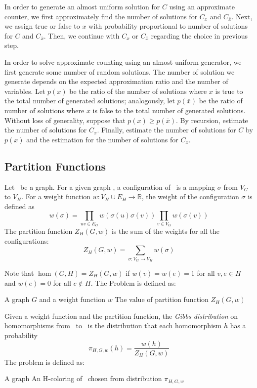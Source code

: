 In order to generate an almost uniform solution for \(C\) using an approximate counter,
we first approximately find the number of solutions for \(C_x\) and \(C_{\bar x}\)\@.
Next, we assign true or false to \(x\) with probability proportional to number of solutions 
for \(C\) and \(C_{\bar x}\)\@. Then, we continue
with \(C_x\) or \(C_{\bar x}\) regarding the choice in previous step.

In order to solve approximate counting using an almost uniform generator, we first
generate some number of random solutions. The number of solution we generate depends 
on the expected approximation ratio and the number of variables.
Let \(p(x)\) be the ratio of the number of solutions
where \(x\) is true to the total number of generated solutions; analogously, let \(p(\bar x)\) be
the ratio of number of solutions where \(x\) is false to the total number of generated solutions.
Without loss of generality, suppose that \(p(x) \ge p(\bar x)\)\@.
By recursion, estimate the number of solutions for \(C_x\). Finally, estimate 
the number of solutions for \(C\) by \(p(x)\) and the estimation for the 
number of solutions for \(C_x\)\@.

\subsection*{Partition Functions}
Let \mH\ be a graph. For a given graph \mG, a configuration of \mG\ is a mapping
\(\sigma\) from \(V_G\) to
\(V_H\). For a weight function \(w: V_H \cup E_H\to \mathbb{R}\), the weight of the configuration 
\(\sigma\) is defined as
\[w(\sigma)=\prod_{uv\in E_G}w(\sigma(u)\sigma(v))\prod_{v\in V_G}w(\sigma(v))\]
The partition function \(Z_H(G,w)\) is the sum of the weights for all the configurations:
\[Z_H(G,w)=\sum_{\sigma:V_G\to V_H}w(\sigma)\]

Note that \(\hom(G,H)=Z_{H}(G,w)\) if \(w(v)=w(e)=1\) for all \(v,e\in H\)
and \(w(e)=0\) for all \(e\not\in H\)\@. 
The  Problem is defined as:

\pnndef%
{A graph \(G\) and a weight function \(w\)}
{The value of partition function \(Z_H(G,w)\)}


Given a weight function and the partition function, 
the \emph{Gibbs distribution} on homomorphisms from \mG\ to \mH\ is
the distribution that each homomorphism \(h\) has a probability 
\[\pi_{H,G,w}(h)=\frac{w(h)}{Z_H(G,w)}\]
The  problem is defined as:

\pnndef%
{A graph \mG}
{An H-coloring of \mG\ chosen from distribution \(\pi_{H,G,w}\)}

